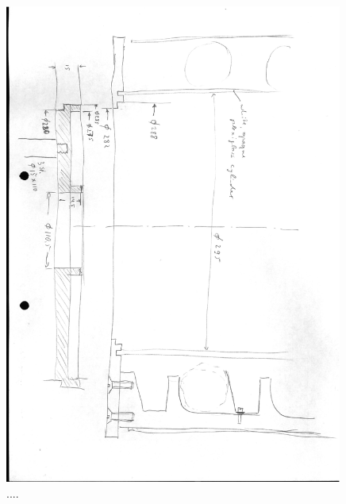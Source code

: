 \documentclass[11pt,a4paper]{article}
\begin{document}
 \begin{figure}[h]
    	\mbox{\includegraphics[width=0.99\textwidth]{figures/Buridan_assay-03.eps}}
 	\caption{....}
  	\label{fig:buridan-03}
 \end{figure}
 
\end{document}
